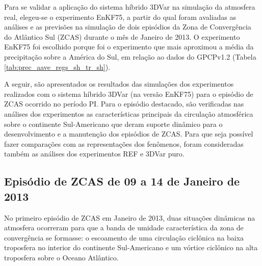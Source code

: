Para se validar a aplicação do sistema híbrido 3DVar na simulação da atmosfera real, elegeu-se o experimento EnKF75, a partir do qual foram avaliadas as análises e as previsões na simulação de dois episódios da Zona de Convergência do Atlântico Sul (ZCAS) durante o mês de Janeiro de 2013. O experimento EnKF75 foi escolhido porque foi o experimento que mais aproximou a média da precipitação sobre a América do Sul, em relação ao dados do GPCPv1.2 (Tabela \ref{tab:prec_aave_regs_sh_tr_sh}). 

A seguir, são apresentados os resultados das simulações dos experimentos realizados com o sistema híbrido 3DVar (na versão EnKF75) para o episódio de ZCAS ocorrido no período PI. Para o episódio destacado, são verificadas nas análises dos experimentos as características principais da circulação atmosférica sobre o continente Sul-Americano que deram suporte dinâmico para o desenvolvimento e a manutenção dos episódios de ZCAS. Para que seja possível fazer comparações com as representações dos fenômenos, foram consideradas também as análises dos experimentos REF e 3DVar puro.

\subsection*{Episódio de ZCAS de 09 a 14 de Janeiro de 2013}
\label{sec:zcasI}

No primeiro episódio de ZCAS em Janeiro de 2013, duas situações dinâmicas na atmosfera ocorreram para que a banda de umidade característica da zona de convergência se formasse: o escoamento de uma circulação ciclônica na baixa troposfera no interior do continente Sul-Americano e um vórtice ciclônico na alta troposfera sobre o Oceano Atlântico. 

